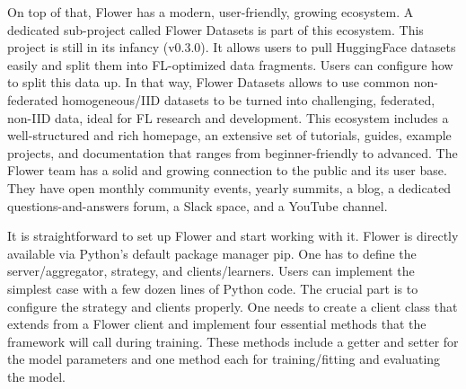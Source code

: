 On top of that, Flower has a modern, user-friendly, growing ecosystem.
A dedicated sub-project called Flower Datasets is part of this ecosystem.
This project is still in its infancy (v0.3.0).
It allows users to pull HuggingFace datasets easily and split them into FL-optimized data fragments.
Users can configure how to split this data up.
In that way, Flower Datasets allows to use common non-federated homogeneous/IID datasets
to be turned into challenging, federated, non-IID data, ideal for FL research and development.
This ecosystem includes a well-structured and rich homepage, an extensive set of tutorials, guides,
example projects, and documentation that ranges from beginner-friendly to advanced.
The Flower team has a solid and growing connection to the public and its user base.
They have open monthly community events, yearly summits, a blog, a dedicated questions-and-answers forum,
a Slack space, and a YouTube channel.

It is straightforward to set up Flower and start working with it.
Flower is directly available via Python's default package manager pip.
One has to define the server/aggregator, strategy, and clients/learners.
Users can implement the simplest case with a few dozen lines of Python code.
The crucial part is to configure the strategy and clients properly.
One needs to create a client class that extends from a Flower client and implement four essential methods
that the framework will call during training.
These methods include a getter and setter for the model parameters and one method each for 
training/fitting and evaluating the model.